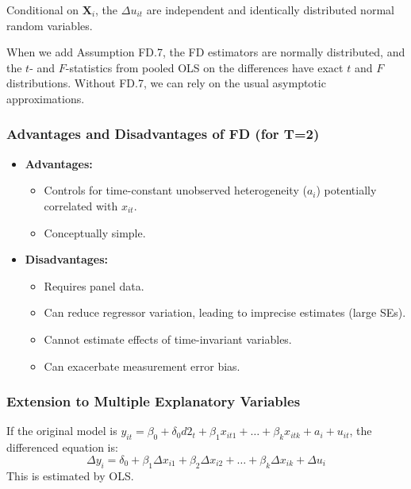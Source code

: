 \documentclass[a4paper, 10pt]{article}
\theoremstyle{definition}	%
\begin{document}
\begin{tcolorbox}[colback=blue!5!white, colframe=blue!80!black, title=Assumption FD.7(Normality)]
Conditional on \( \mathbf{X}_i \), the \( \Delta u_{it} \) are independent and identically distributed normal random variables.
\end{tcolorbox}
When we add Assumption FD.7, the FD estimators are normally distributed, and the \( t \)- and \( F \)-statistics from pooled OLS on the differences have exact \( t \) and \( F \) distributions. Without FD.7, we can rely on the usual asymptotic approximations.

\subsubsection{Advantages and Disadvantages of FD (for T=2)}
\begin{itemize}
    \item \textbf{Advantages:}
    \begin{itemize}
        \item Controls for time-constant unobserved heterogeneity (\(a_i\)) potentially correlated with \(x_{it}\).
        \item Conceptually simple.
    \end{itemize}
    \item \textbf{Disadvantages:}
    \begin{itemize}
        \item Requires panel data.
        \item Can reduce regressor variation, leading to imprecise estimates (large SEs).
        \item Cannot estimate effects of time-invariant variables.
        \item Can exacerbate measurement error bias.
    \end{itemize}
\end{itemize}

\subsubsection{Extension to Multiple Explanatory Variables}
If the original model is \(y_{it} = \beta_0 + \delta_0 d2_t + \beta_1 x_{it1} + \dots + \beta_k x_{itk} + a_i + u_{it}\), the differenced equation is:
\[ \Delta y_i = \delta_0 + \beta_1 \Delta x_{i1} + \beta_2 \Delta x_{i2} + \dots + \beta_k \Delta x_{ik} + \Delta u_i \]
This is estimated by OLS.

\newpage
\end{document}
